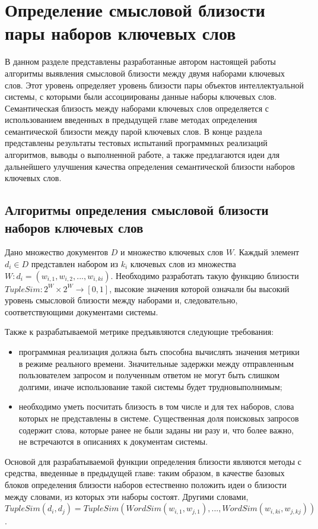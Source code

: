 \chapter{Определение смысловой близости пары наборов ключевых слов}
В данном разделе представлены разработанные автором настоящей работы алгоритмы выявления смысловой близости между двумя наборами ключевых слов.  Этот уровень определяет уровень близости пары объектов интеллектуальной системы, с которыми были ассоциированы данные наборы ключевых слов.
Семантическая близость между наборами ключевых слов определяется с использованием введенных в предыдущей главе методах определения семантической близости между парой ключевых слов.
В конце раздела представлены результаты тестовых испытаний программных реализаций алгоритмов, выводы о выполненной работе, а также предлагаются идеи для дальнейшего улучшения качества определения семантической близости наборов ключевых слов.

\section{Алгоритмы определения смысловой близости наборов ключевых слов}

Дано множество документов $D$ и множество ключевых слов $W$. Каждый элемент $d_i \in D$ представлен набором из $k_i$ ключевых слов из множества $W: d_i = (w_{i,1},w_{i,2},...,w_{i,ki})$. Необходимо разработать такую функцию близости $TupleSim : 2^W \times 2^W \rightarrow [0, 1]$, высокие значения которой означали бы высокий уровень смысловой близости между наборами и, следовательно, соответствующими документами системы. 

Также к разрабатываемой метрике предъявляются следующие требования:
\begin{itemize}
    \item программная реализация должна быть способна вычислять значения метрики в режиме реального времени. Значительные задержки между отправленным пользователем запросом и полученным ответом не могут быть слишком долгими, иначе использование такой системы будет трудновыполнимым;
    \item необходимо уметь посчитать близость в том числе и для тех наборов, слова которых не представлены в системе. Существенная доля поисковых запросов содержит слова, которые ранее не были заданы ни разу и, что более важно, не встречаются в описаниях к документам системы.
\end{itemize}


Основой для разрабатываемой функции определения близости являются методы с средства, введенные в предыдущей главе: таким образом, в качестве базовых  блоков определения близости наборов естественно положить идеи о близости между словами, из которых эти наборы состоят. Другими словами, $TupleSim(d_i, d_j) = TupleSim(WordSim(w_{i,1}, w_{j,1}), ... , WordSim(w_{i,ki}, w_{j,kj}))$. 

